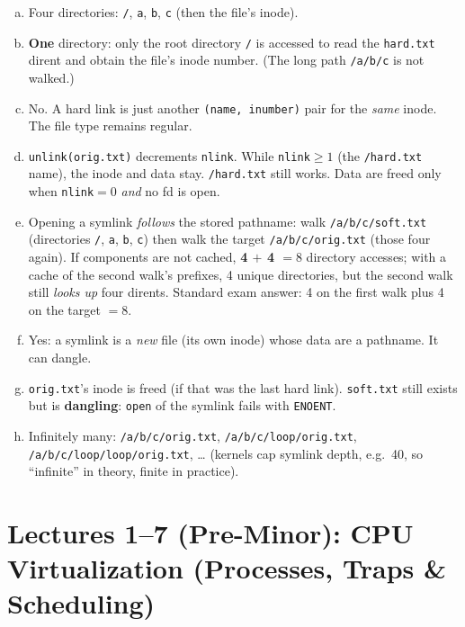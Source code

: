 \documentclass[11pt,a4paper]{article}
\newenvironment{Sol}{%
  \begin{tcolorbox}[sboxstyle, title={Solution}]%
}{%
  \end{tcolorbox}\vspace{0.35em}%
}
\begin{document}
\begin{Sol}
\begin{enumerate}[(a)]
\item Four directories: \texttt{/}, \texttt{a}, \texttt{b}, \texttt{c}
      (then the file's inode).
\item \textbf{One} directory: only the root directory \texttt{/} is
      accessed to read the \texttt{hard.txt} dirent and obtain the
      file's inode number. (The long path \texttt{/a/b/c} is not walked.)
\item No. A hard link is just another \texttt{(name, inumber)} pair for
      the \emph{same} inode. The file type remains regular.
\item \texttt{unlink(orig.txt)} decrements \texttt{nlink}. While
      \texttt{nlink}$\ge 1$ (the \texttt{/hard.txt} name), the inode and
      data stay. \texttt{/hard.txt} still works. Data are freed only
      when \texttt{nlink}$=0$ \emph{and} no fd is open.
\item Opening a symlink \emph{follows} the stored pathname: walk
      \texttt{/a/b/c/soft.txt} (directories \texttt{/}, \texttt{a},
      \texttt{b}, \texttt{c}) then walk the target
      \texttt{/a/b/c/orig.txt} (those four again). If components are
      not cached, \textbf{4 $+$ 4 $= 8$} directory accesses; with a
      cache of the second walk's prefixes, 4 unique directories, but
      the second walk still \emph{looks up} four dirents. Standard
      exam answer: 4 on the first walk plus 4 on the target $=8$.
\item Yes: a symlink is a \emph{new} file (its own inode) whose data
      are a pathname. It can dangle.
\item \texttt{orig.txt}'s inode is freed (if that was the last hard
      link). \texttt{soft.txt} still exists but is \textbf{dangling}:
      \texttt{open} of the symlink fails with \texttt{ENOENT}.
\item Infinitely many: \texttt{/a/b/c/orig.txt},
      \texttt{/a/b/c/loop/orig.txt},
      \texttt{/a/b/c/loop/loop/orig.txt}, \ldots
      (kernels cap symlink depth, e.g.\ 40, so ``infinite'' in theory,
      finite in practice).
\end{enumerate}
\end{Sol}

\clearpage

\section{Lectures 1--7 (Pre-Minor): CPU Virtualization (Processes, Traps \& Scheduling)}
\end{document}
